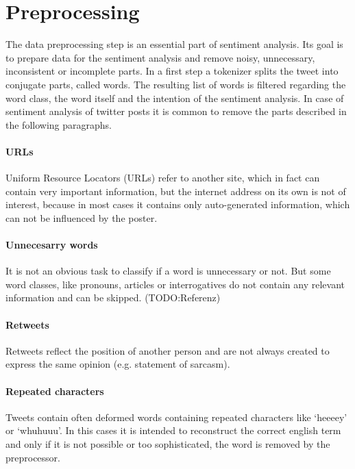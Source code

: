 \section{Preprocessing}
The data preprocessing step is an essential 
part of sentiment analysis. Its goal is to prepare data
for the sentiment analysis and remove noisy, unnecessary, 
inconsistent or incomplete parts.\autocite{Hemalatha2012}
In a first step a tokenizer splits the tweet into conjugate parts, called words. 
The resulting list of words is filtered regarding the word class, 
the word itself and the intention of the sentiment analysis. 
In case of sentiment analysis of twitter posts it is common to 
remove the parts described in the following paragraphs.\autocite{Hemalatha2012}

\paragraph{URLs}
Uniform Resource Locators (URLs) refer to another site, which 
in fact can contain very important information, but the internet address
on its own is not of interest, because in most cases it
contains only auto-generated information, which can not be influenced 
by the poster.

\paragraph{Unnecesarry words}
It is not an obvious task to classify if a word is unnecessary
or not. But some word classes, like pronouns, articles or interrogatives
do not contain any relevant information and can be skipped. (TODO:Referenz)

\paragraph{Retweets}
Retweets reflect the position of another person and are not always
created to express the same opinion (e.g. statement of sarcasm).

\paragraph{Repeated characters}
Tweets contain often deformed words 
containing repeated characters like `heeeey' or
`whuhuuu'. In this cases it is intended to reconstruct 
the correct english term and only if it is not 
possible or too sophisticated, the word is removed
by the preprocessor.


